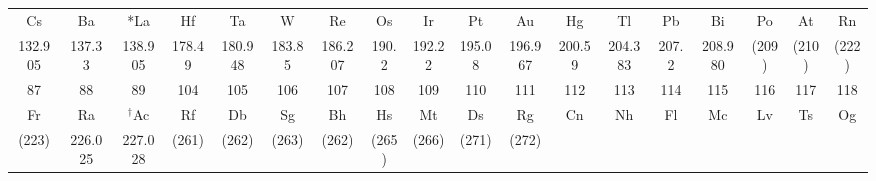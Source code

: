 \documentclass[10pt,landscape]{book}
\begin{document}
\begin{center}
\begin{tabular}{|c*{16}{|c}|c|}
        Cs             & Ba             & *La            & Hf            & Ta             & W             & Re             & Os            & Ir             & Pt            & Au             & Hg            & Tl             & Pb             & Bi             & Po            & At             & Rn                                \\[-2mm]
        \small 132.905 & \small 137.33  & \small 138.905 & \small 178.49 & \small 180.948 & \small 183.85 & \small 186.207 & \small 190.2  & \small 192.22  & \small 195.08 & \small 196.967 & \small 200.59 & \small 204.383 & \small 207.2   & \small 208.980 & \small (209)  & \small (210)   & \small (222)                      \\
        \hline
        \small 87      & \small 88      & \small 89      & \small 104    & \small 105     & \small 106    & \small 107     & \small 108    & \small 109     & \small 110    & \small 111     & \small 112    & \small 113     & \small 114     & \small 115     & \small 116    & \small 117     & \small 118 \tabularnewline [-1mm]
        Fr             & Ra             & $^\dagger$Ac   & Rf            & Db             & Sg            & Bh             & Hs            & Mt             & Ds            & Rg             & Cn            & Nh             & Fl             & Mc             & Lv            & Ts             & Og\tabularnewline [-2mm]
        \small (223)   & \small 226.025 & \small 227.028 & \small (261)  & \small (262)   & \small (263)  & \small (262)   & \small (265)  & \small (266)   & \small (271)  & \small (272)   &               &                &                &                &               &                &                                   \\
    \end{tabular}
\end{center}
\vspace{0.5cm}
\hspace{-0.2cm}
\end{document}
